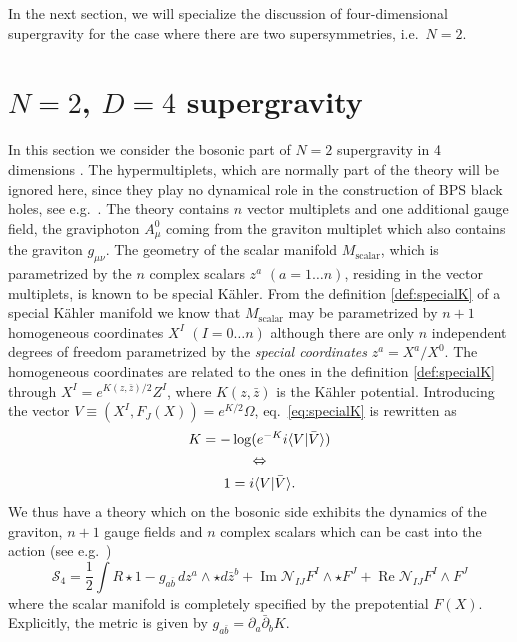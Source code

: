 \documentclass[12pt,twoside]{book}
\newcommand\real{\operatorname{Re}}
\newcommand\imag{\operatorname{Im}}
\begin{document}
In the next section, we will specialize the discussion of four-dimensional supergravity for the case where there are two supersymmetries, i.e.\ $N = 2$.


\section{$N=2$, $D=4$ supergravity}
\label{sec:N2D4Sugra}

In this section we consider the bosonic part of $N=2$ supergravity in 4 dimensions \cite{deWit:1985}. The hypermultiplets, which are normally part of the theory will be ignored here, since they play no dynamical role in the construction of BPS black holes, see e.g.\ \cite{DAuria:uq}. The theory contains $n$ vector multiplets and one additional gauge field, the graviphoton $A_{\mu}^{0}$ coming from the graviton multiplet which also contains the graviton $g_{\mu\nu}$. The geometry of the scalar manifold $M_{\mathrm{scalar}}$, which is parametrized by the  $n$ complex scalars $z^{a}$ $(a=1\ldots n)$, residing in the vector multiplets, is known to be special K\"ahler.
From the definition \ref{def:specialK} of a special K\"ahler manifold we know that $M_{\mathrm{scalar}}$ may be parametrized by $n+1$ homogeneous coordinates $X^{I}$ $(I=0\ldots n)$ although there are only $n$ independent degrees of freedom parametrized by the \emph{special coordinates} $z^{a}  = X^{a} / X^{0}$. The homogeneous coordinates are related to the ones in the definition \ref{def:specialK} through $X^{I} = e^{K(z,\bar{z})/2} Z^{I}$, where $K(z,\bar{z})$ is the K\"ahler potential. Introducing the vector $V \equiv (X^{I}, F_{J}(X)) = e^{K/2} \Omega$, eq.\ \eqref{eq:specialK} is rewritten as
\begin{gather}
K = - \log ( e^{- K} i \langle V | \bar{V} \rangle ) \notag \\
\Leftrightarrow \notag \\
1 = i \langle V | \bar{V} \rangle.
\end{gather}
We thus have a theory which on the bosonic side exhibits the dynamics of the graviton, $n+1$ gauge fields and $n$ complex scalars which can be cast into the action \cite{deWit:1985} (see e.g.\ \cite{Wit:1993kx})
%
\begin{equation}\label{eq:actionN2D4}
\mathcal{S}_{4} = \frac{1}{2}\int R\star 1- g_{a\bar{b}} \,dz^{a}\wedge\star d\bar{z}^{b}+ \imag \mathcal{N}_{IJ}F^{I}\wedge\star F^{J} + \real \mathcal{N}_{IJ}F^{I}\wedge F^{J}
\end{equation}
where the scalar manifold is completely specified by the prepotential $F(X)$. Explicitly, the metric is given by $g_{a\bar{b}} = \partial_{a} \bar{\partial}_{b} K$.
\end{document}
